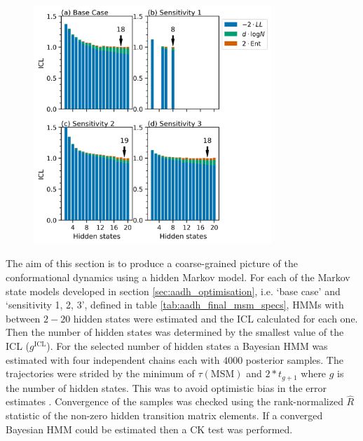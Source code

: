 \begin{figure}
    \centering
    \includegraphics[width=0.8\textwidth]{chapters/aadh/figures/aadh_h_state_selection.png}
    \label{fig:aadh_h_selection_results}
\end{figure}

The aim of this section is to produce a coarse-grained picture of the conformational dynamics using a hidden Markov model. For each of the Markov state models developed in section \ref{sec:aadh_optimisation}, i.e. `base case' and `sensitivity 1, 2, 3', defined in table \ref{tab:aadh_final_msm_specs}, HMMs with between $2 - 20$ hidden states were estimated and the ICL calculated for each one. Then the number of hidden states was determined by the smallest value of the ICL ($g^{\mathrm{ICL}}$). For the selected number of hidden states a Bayesian HMM was estimated with four independent chains each with $4000$ posterior samples. The trajectories were strided by the minimum of $\tau(\mathrm{MSM})$ and $2*t_{g+1}$ where $g$ is the number of hidden states. This was to avoid optimistic bias in the error estimates \cite{trendelkamp-schroerEstimationUncertaintyReversible2015b}. Convergence of the samples was checked using the rank-normalized $\hat{R}$ statistic \cite{vehtariRanknormalizationFoldingLocalization2020} of the non-zero hidden transition matrix elements. If a converged Bayesian HMM could be estimated then a CK test was performed. 

